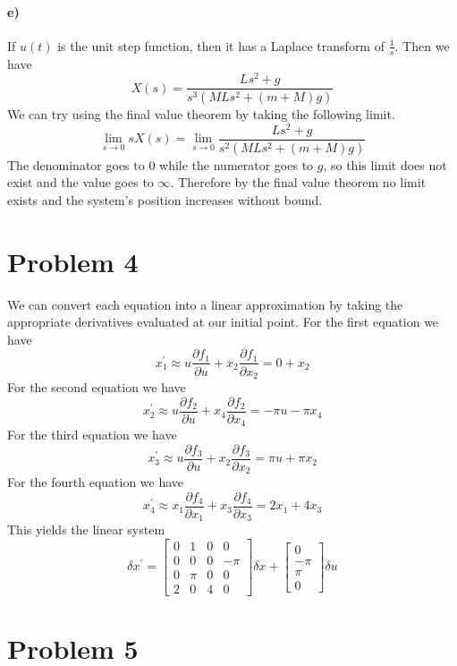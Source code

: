 \documentclass[12pt]{article}
\begin{document}
\paragraph{e)}

If \(u(t)\) is the unit step function, then it has a Laplace transform of \(\frac{1}{s}\). Then we have
\[X(s)=\frac{Ls^2+g}{s^3(MLs^2+(m+M)g)}\]
We can try using the final value theorem by taking the following limit.
\[\lim_{s\to 0} sX(s)=\lim_{s\to 0} \frac{Ls^2+g}{s^2(MLs^2+(m+M)g)}\]
The denominator goes to \(0\) while the numerator goes to \(g\), so this limit does not exist and the value goes to \(\infty\).
Therefore by the final value theorem no limit exists and the system's position increases without bound.

\section*{Problem 4}

We can convert each equation into a linear approximation by taking the appropriate derivatives evaluated at our initial point.
For the first equation we have
\[x_1^\prime \approx u\frac{\partial f_1}{\partial u} + x_2\frac{\partial f_1}{\partial x_2}=0 + x_2\]
For the second equation we have
\[x_2^\prime \approx u\frac{\partial f_2}{\partial u} + x_4\frac{\partial f_2}{\partial x_4}=-\pi u - \pi x_4\]
For the third equation we have
\[x_3^\prime \approx u\frac{\partial f_3}{\partial u} + x_2\frac{\partial f_3}{\partial x_2}=\pi u + \pi x_2\]
For the fourth equation we have
\[x_4^\prime \approx x_1\frac{\partial f_4}{\partial x_1} + x_3\frac{\partial f_4}{\partial x_3}=2x_1 + 4x_3\]
This yields the linear system
\[\delta x^\prime = \begin{bmatrix}
    0 & 1 & 0 & 0\\
    0 & 0 & 0 & -\pi\\
    0 & \pi & 0 & 0\\
    2 & 0 & 4 & 0
\end{bmatrix}\delta x + \begin{bmatrix}
    0\\
    -\pi\\
    \pi\\
    0
\end{bmatrix}\delta u\]

\section*{Problem 5}
\end{document}
